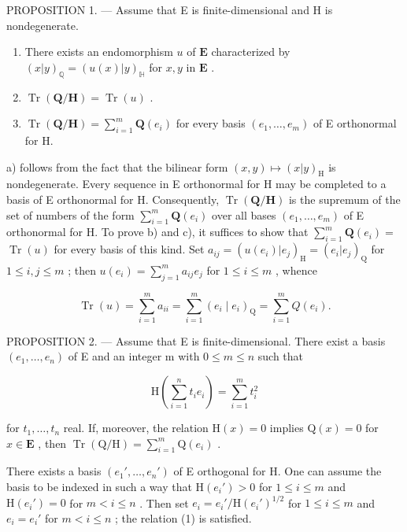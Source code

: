 PROPOSITION 1. --- Assume that E is finite-dimensional and H is nondegenerate.

\begin{enumerate}
\def\labelenumi{\alph{enumi})}
\item
  There exists an endomorphism \(u\) of \(\mathbf{E}\) characterized by \((x|y)_{\mathbb{Q}} = (u(x)|y)_{\mathbb{H}}\) for \(x, y\) in \(\mathbf{E}\) .
\item
  \(\operatorname{Tr}(\mathbf{Q} / \mathbf{H}) = \operatorname{Tr}(u)\) .
\item
  \(\operatorname{Tr}(\mathbf{Q} / \mathbf{H}) = \sum_{i=1}^{m} \mathbf{Q}(e_i)\) for every basis \((e_1, \ldots, e_m)\) of E orthonormal for H.
\end{enumerate}

a) follows from the fact that the bilinear form \((x,y)\mapsto (x|y)_{\mathrm{H}}\) is nondegenerate. Every sequence in E orthonormal for H may be completed to a basis of E orthonormal for H. Consequently, \(\operatorname {Tr}(\mathbf{Q} / \mathbf{H})\) is the supremum of the set of numbers of the form \(\sum_{i = 1}^{m}\mathbf{Q}(e_i)\) over all bases \((e_1,\ldots ,e_m)\) of E orthonormal for H. To prove b) and c), it suffices to show that \(\sum_{i = 1}^{m}\mathbf{Q}(e_i) =\) \(\operatorname {Tr}(u)\) for every basis of this kind. Set \(a_{ij} = (u(e_i)|e_j)_{\mathrm{H}} = (e_i|e_j)_{\mathrm{Q}}\) for \(1\leqslant i,j\leqslant m\) ; then \(u(e_i) = \sum_{j = 1}^{m}a_{ij}e_j\) for \(1\leqslant i\leqslant m\) , whence

\[
\operatorname{Tr} (u) = \sum_ {i = 1} ^ {m} a _ {i i} = \sum_ {i = 1} ^ {m} \left(e _ {i} \mid e _ {i}\right) _ {\mathrm{Q}} = \sum_ {i = 1} ^ {m} Q \left(e _ {i}\right).\tag{Q.E.D.}
\]

PROPOSITION 2. --- Assume that E is finite-dimensional. There exist a basis \((e_{1},\ldots,e_{n})\) of E and an integer m with \(0\leqslant m\leqslant n\) such that

\[
\mathrm{H} \left(\sum_ {i = 1} ^ {n} t _ {i} e _ {i}\right) = \sum_ {i = 1} ^ {m} t _ {i} ^ {2}\tag{1}
\]

for \(t_1, \ldots, t_n\) real. If, moreover, the relation \(\mathrm{H}(x) = 0\) implies \(\mathrm{Q}(x) = 0\) for \(x \in \mathbf{E}\) , then \(\operatorname{Tr}(\mathrm{Q}/\mathrm{H}) = \sum_{i=1}^{m} \mathrm{Q}(e_i)\) .

There exists a basis \((e_1', \ldots, e_n')\) of E orthogonal for H. One can assume the basis to be indexed in such a way that \(\mathrm{H}(e_i') > 0\) for \(1 \leqslant i \leqslant m\) and \(\mathrm{H}(e_i') = 0\) for \(m < i \leqslant n\) . Then set \(e_i = e_i' / \mathrm{H}(e_i')^{1/2}\) for \(1 \leqslant i \leqslant m\) and \(e_i = e_i'\) for \(m < i \leqslant n\) ; the relation (1) is satisfied.


